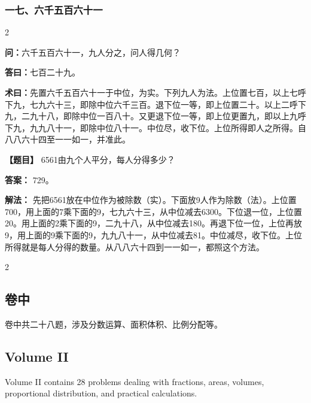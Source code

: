 \documentclass[11pt,a4paper]{article}
\begin{document}
\vspace{0.3cm}

\subsubsection*{一七、六千五百六十一}
\begin{paracol}{2}
\begin{problemclassical}
\textbf{问：}六千五百六十一，九人分之，问人得几何？

\textbf{答曰：}七百二十九。

\textbf{术曰：}先置六千五百六十一于中位，为实。下列九人为法。上位置七百，以上七呼下九，七九六十三，即除中位六千三百。退下位一等，即上位置二十。以上二呼下九，二九十八，即除中位一百八十。又更退下位一等，即上位更置九，即以上九呼下九，九九八十一，即除中位八十一。中位尽，收下位。上位所得即人之所得。自八八六十四至一一如一，并准此。
\end{problemclassical}
\switchcolumn
\begin{problemmodern}
\textbf{【题目】} 6561由九个人平分，每人分得多少？

\textbf{答案：} 729。

\textbf{解法：} 先把6561放在中位作为被除数（实）。下面放9人作为除数（法）。上位置700，用上面的7乘下面的9，七九六十三，从中位减去6300。下位退一位，上位置20。用上面的2乘下面的9，二九十八，从中位减去180。再退下位一位，上位再放9，用上面的9乘下面的9，九九八十一，从中位减去81。中位减尽，收下位。上位所得就是每人分得的数量。从八八六十四到一一如一，都照这个方法。
\end{problemmodern}
\end{paracol}

\newpage

\begin{paracol}{2}

\begin{classicalbox}
\section*{卷中}

卷中共二十八题，涉及分数运算、面积体积、比例分配等。
\end{classicalbox}

\switchcolumn

\begin{modernbox}
\section*{Volume II}

Volume II contains 28 problems dealing with fractions, areas, volumes, proportional distribution, and practical calculations.
\end{modernbox}

\end{paracol}
\end{document}
